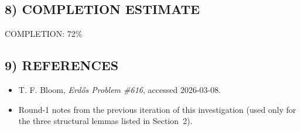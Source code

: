 \subsection*{8) COMPLETION ESTIMATE}

COMPLETION: 72\%

\subsection*{9) REFERENCES}

\begin{itemize}
\item T. F. Bloom, \emph{Erd\H{o}s Problem \#616}, accessed 2026-03-08.
\item Round-1 notes from the previous iteration of this investigation (used only for the three structural lemmas listed in Section~2).
\end{itemize}

